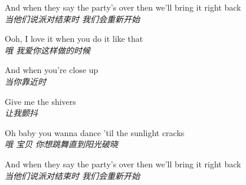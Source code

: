 \begin{spacing}{1.5}
\begin{flushleft}
And when they say the party's over then we'll bring it right back\\
\textit{当他们说派对结束时 我们会重新开始}\lyricspace

Ooh, I love it when you do it like that\\
\textit{哦 我爱你这样做的时候}\lyricspace

And when you're close up\\
\textit{当你靠近时}\lyricspace

Give me the shivers\\
\textit{让我颤抖}\lyricspace

Oh baby you wanna dance 'til the sunlight cracks\\
\textit{哦 宝贝 你想跳舞直到阳光破晓}\lyricspace

And when they say the party's over then we'll bring it right back\\
\textit{当他们说派对结束时 我们会重新开始}\lyricspace
\end{flushleft}
\end{spacing} 
